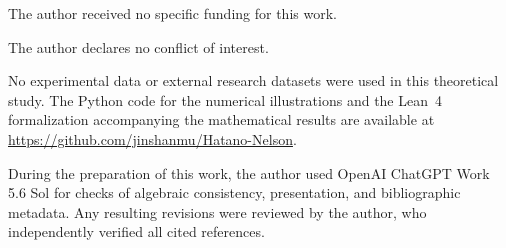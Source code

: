 
\bigskip
{}
The author received no specific funding for this work.

\medskip
{}
The author declares no conflict of interest.

\medskip
{}
No experimental data or external research datasets were used in this
theoretical study.  The Python code for the numerical illustrations and the
Lean~4 formalization accompanying the mathematical results are available at
\url{https://github.com/jinshanmu/Hatano-Nelson}.

\medskip
{}
During the preparation of this work, the author used OpenAI ChatGPT Work 5.6
Sol for checks of algebraic consistency, presentation, and bibliographic
metadata.  Any resulting revisions were reviewed by the author, who
independently verified all cited references.
